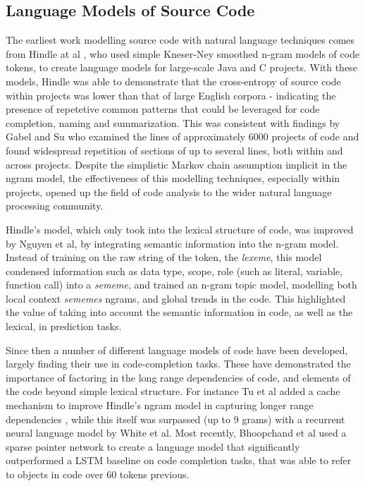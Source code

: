 \subsection{Language Models of Source Code}

The earliest work modelling source code with natural language techniques comes from Hindle at al \cite{hindle_naturalness_nodate}, who used simple Kneser-Ney smoothed n-gram models of code tokens, to create language models for large-scale Java and C projects.
With these models, Hindle was able to demonstrate that the cross-entropy of source code within projects was lower than that of large English corpora - indicating the presence of repetetive common patterns that could be leveraged for code completion, naming and summarization.
This was consistent with findings by Gabel and Su \cite{gabel_study_2010} who examined the lines of approximately 6000 projects of code and found widespread repetition of sections of up to several lines, both within and across projects.
Despite the simplistic Markov chain assumption implicit in the ngram model, the effectiveness of this modelling techniques, especially within projects, opened up the field of code analysis to the wider natural language processing community.

Hindle's model, which only took into the lexical structure of code, was improved by Nguyen et al\cite{nguyen_statistical_2013}, by integrating semantic information into the n-gram model.
Instead of training on the raw string of the token, the \textit{lexeme}, this model condensed information such as data type, scope, role (such as literal, variable, function call) into a \textit{sememe}, and trained an n-gram topic model, modelling both local context \textit{sememes} ngrams, and global trends in the code.
This highlighted the value of taking into account the semantic information in code, as well as the lexical, in prediction tasks.

Since then a number of different language models of code have been developed, largely finding their use in code-completion tasks. These have demonstrated the importance of factoring in the long range dependencies of code, and elements of the code beyond simple lexical structure. For instance Tu et al added a cache mechanism to improve Hindle's ngram model in capturing longer range dependencies  \cite{tu_localness_nodate}, while this itself was surpassed (up to 9 grams) with a recurrent neural language model by White et al\cite{white_toward_2015}.
Most recently, Bhoopchand et al used a sparse pointer network to create a language model that significantly outperformed a LSTM baseline on code completion tasks, that was able to refer to objects in code over 60 tokens previous\cite{bhoopchand_learning_2016}.

